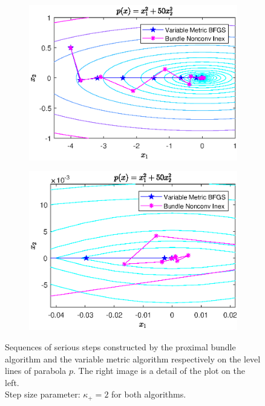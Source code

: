 \begin{figure}[ht]
	\begin{subfigure}[t]{0.49\textwidth}
		\includegraphics[width=\textwidth]{Pictures/Plots/final_parab.eps}
	\end{subfigure}%
	\hfill
	\begin{subfigure}[t]{0.49\textwidth}
			\includegraphics[width=\textwidth]{Pictures/Plots/final_parab_detail.eps}
	\end{subfigure}
	\caption[Serious steps on parabola]{Sequences of serious steps constructed by the proximal bundle algorithm and the variable metric algorithm respectively on the level lines of parabola \(p\). The right image is a detail of the plot on the left.\\
	Step size parameter: \(\kappa_+ = 2\) for both algorithms.}
	\label{fig_contour_parab}
\end{figure}

